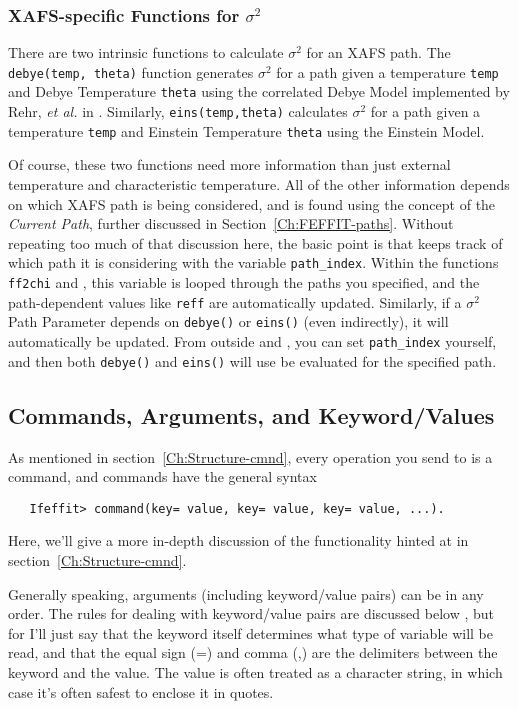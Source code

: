 \subsubsection{XAFS-specific Functions for $\sigma^2$}

There are two intrinsic functions to calculate $\sigma^2$ for an XAFS path.
The {\tt{debye(temp, theta)}} function generates $\sigma^2$ for a path
given a temperature {\tt{temp}} and Debye Temperature {\tt{theta}} using
the correlated Debye Model implemented by Rehr, {\it et al.\/} in {\feff}.
Similarly, {\tt{eins(temp,theta)}} calculates $\sigma^2$ for a path given a
temperature {\tt{temp}} and Einstein Temperature {\tt{theta}} using the
Einstein Model.

Of course, these two functions need more information than just external
temperature and characteristic temperature.  All of the other information
depends on which XAFS path is being considered, and is found using the
concept of the {\emph{Current Path}}, further discussed in
Section~{\ref{Ch:FEFFIT-paths}}.  Without repeating too much of that
discussion here, the basic point is that {\ifeffit} keeps track of which
path it is considering with the variable {\tt{path\_index}}.  Within the
functions {\tt{ff2chi}} and {}, this variable is looped
through the paths you specified, and the path-dependent values like
{\tt{reff}} are automatically updated.  Similarly, if a $\sigma^2$ Path
Parameter depends on {\tt{debye()}} or {\tt{eins()}} (even indirectly), it
will automatically be updated.  From outside {} and
{}, you can set {\tt{path\_index}} yourself, and then both
{\tt{debye()}} and {\tt{eins()}} will use be evaluated for the specified
path.

\subsection{Commands, Arguments, and Keyword/Values} \label{Ch:Structure-commands}

As mentioned in section~\ref{Ch:Structure-cmnd}, every operation you 
send to {\ifeffit} is a command, and commands have the general syntax
\begin{verbatim}
   Ifeffit> command(key= value, key= value, key= value, ...).
\end{verbatim}
\noindent
Here, we'll give a more in-depth discussion of the functionality hinted
at in section~\ref{Ch:Structure-cmnd}.

Generally speaking, arguments (including keyword/value pairs) can be in any
order.  The rules for dealing with keyword/value pairs are discussed below
, but for I'll just say that the keyword itself determines what type of
variable will be read, and that the equal sign (=) and comma (,) are the
delimiters between the keyword and the value.  The value is often treated
as a character string, in which case it's often safest to enclose it in
quotes.

